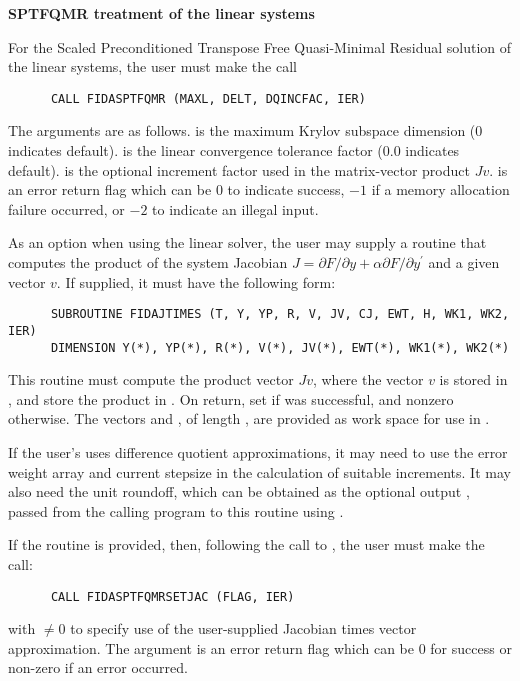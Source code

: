 \begin{Steps}
  {\s}{\p} {\bf SPTFQMR treatment of the linear systems}
  
  For the Scaled Preconditioned Transpose Free Quasi-Minimal Residual solution of the
  linear systems, the user must make the call
\begin{verbatim}
      CALL FIDASPTFQMR (MAXL, DELT, DQINCFAC, IER)
\end{verbatim}
  The arguments are as follows.
   is the maximum Krylov subspace dimension ($0$ indicates default).
   is the linear convergence tolerance factor ($0.0$ indicates default).
   is the optional increment factor used in the matrix-vector product $Jv$.
   is an error return flag which can be $0$ to indicate success, $-1$
  if a memory allocation failure occurred, or $-2$ to indicate an illegal input.
  
  As an option when using the {\sptfqmr} linear solver, the user may supply a 
  routine that computes the product of the system Jacobian
  $J = \partial F / \partial y + \alpha \partial F / \partial y^\prime$
  and a given vector $v$.  If supplied, it must have the following form:
\begin{verbatim}
      SUBROUTINE FIDAJTIMES (T, Y, YP, R, V, JV, CJ, EWT, H, WK1, WK2, IER)
      DIMENSION Y(*), YP(*), R(*), V(*), JV(*), EWT(*), WK1(*), WK2(*)
\end{verbatim}
  This routine must compute the product vector $Jv$, where the vector $v$ is
  stored in , and store the product in .  On return, set
   if  was successful, and nonzero otherwise.
  The vectors  and , of length , are
  provided as work space for use in .

  If the user's  uses difference quotient approximations, it
  may need to use the error weight array  and current stepsize 
  in the calculation of suitable increments.  It may also need the unit
  roundoff, which can be obtained as the optional output ,
  passed from the calling program to this routine using .

  If the  routine is provided, then, 
  following the call to , the user must make the call:
\begin{verbatim}
      CALL FIDASPTFQMRSETJAC (FLAG, IER)
\end{verbatim}
  with  $\neq 0$ to specify use of the user-supplied Jacobian times
  vector approximation.
  The argument  is an error return flag which can be $0$ 
  for success or non-zero if an error occurred.
  

\end{Steps}
